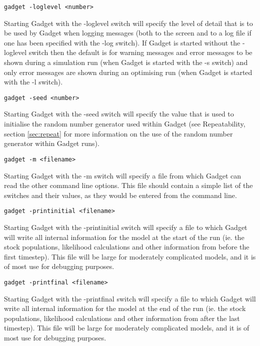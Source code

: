 \documentclass[]{book}
\begin{document}
\begin{verbatim}
gadget -loglevel <number>
\end{verbatim}

Starting Gadget with the -loglevel switch will specify the level of
detail that is to be used by Gadget when logging messages (both to the
screen and to a log file if one has been specified with the -log
switch). If Gadget is started without the -loglevel switch then the
default is for warning messages and error messages to be shown during a
simulation run (when Gadget is started with the -s switch) and only
error messages are shown during an optimising run (when Gadget is
started with the -l switch).

\begin{verbatim}
gadget -seed <number>
\end{verbatim}

Starting Gadget with the -seed switch will specify the value that is
used to initialise the random number generator used within Gadget (see
Repeatability, section \ref{sec:repeat} for more information on the use of the random
number generator within Gadget runs).

\begin{verbatim}
gadget -m <filename>
\end{verbatim}

Starting Gadget with the -m switch will specify a file from which Gadget
can read the other command line options. This file should contain a
simple list of the switches and their values, as they would be entered
from the command line.

\begin{verbatim}
gadget -printinitial <filename>
\end{verbatim}

Starting Gadget with the -printinitial switch will specify a file to
which Gadget will write all internal information for the model at the
start of the run (ie. the stock populations, likelihood calculations and
other information from before the first timestep). This file will be
large for moderately complicated models, and it is of most use for
debugging purposes.

\begin{verbatim}
gadget -printfinal <filename>
\end{verbatim}

Starting Gadget with the -printfinal switch will specify a file to which
Gadget will write all internal information for the model at the end of
the run (ie. the stock populations, likelihood calculations and other
information from after the last timestep). This file will be large for
moderately complicated models, and it is of most use for debugging
purposes.
\end{document}
